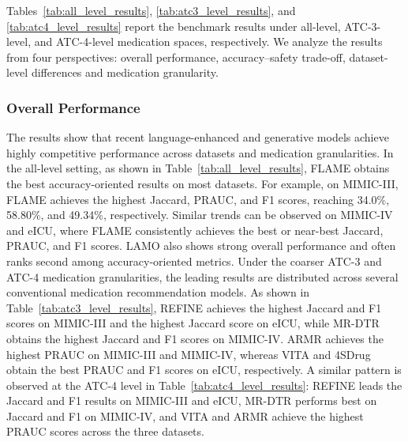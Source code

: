 \documentclass[manuscript,review]{acmart}
\begin{document}
Tables~\ref{tab:all_level_results}, \ref{tab:atc3_level_results}, and \ref{tab:atc4_level_results} report the benchmark results under all-level, ATC-3-level, and ATC-4-level medication spaces, respectively. We analyze the results from four perspectives: overall performance, accuracy--safety trade-off, dataset-level differences and medication granularity.

\subsubsection{Overall Performance}
The results show that recent language-enhanced and generative models achieve highly competitive performance across datasets and medication granularities. In the all-level setting, as shown in Table~\ref{tab:all_level_results}, FLAME obtains the best accuracy-oriented results on most datasets. For example, on MIMIC-III, FLAME achieves the highest Jaccard, PRAUC, and F1 scores, reaching 34.0\%, 58.80\%, and 49.34\%, respectively. Similar trends can be observed on MIMIC-IV and eICU, where FLAME consistently achieves the best or near-best Jaccard, PRAUC, and F1 scores. LAMO also shows strong overall performance and often ranks second among accuracy-oriented metrics.
Under the coarser ATC-3 and ATC-4 medication granularities, the leading results are distributed across several conventional medication recommendation models. As shown in Table~\ref{tab:atc3_level_results}, REFINE achieves the highest Jaccard and F1 scores on MIMIC-III and the highest Jaccard score on eICU, while MR-DTR obtains the highest Jaccard and F1 scores on MIMIC-IV. ARMR achieves the highest PRAUC on MIMIC-III and MIMIC-IV, whereas VITA and 4SDrug obtain the best PRAUC and F1 scores on eICU, respectively. A similar pattern is observed at the ATC-4 level in Table~\ref{tab:atc4_level_results}: REFINE leads the Jaccard and F1 results on MIMIC-III and eICU, MR-DTR performs best on Jaccard and F1 on MIMIC-IV, and VITA and ARMR achieve the highest PRAUC scores across the three datasets.
\end{document}
